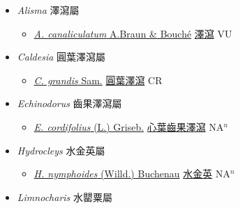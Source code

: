 
  \begin{itemize}
 \item[] \textit{Alisma} 澤瀉屬
                    
  \begin{itemize}
        \item[] \href{http://www.theplantlist.org/tpl1.1/search?q=Alisma+canaliculatum}{\textit{A. canaliculatum} A.Braun \& Bouché}   \href{\detokenize{http://taibnet.sinica.edu.tw/chi/taibnet_species_list.php?T2=澤瀉&T2_new_value=true&fr=y}}{澤瀉} VU
  \end{itemize}
 \item[] \textit{Caldesia} 圓葉澤瀉屬
                    
  \begin{itemize}
        \item[] \href{http://www.theplantlist.org/tpl1.1/search?q=Caldesia+grandis}{\textit{C. grandis} Sam.}   \href{\detokenize{http://taibnet.sinica.edu.tw/chi/taibnet_species_list.php?T2=圓葉澤瀉&T2_new_value=true&fr=y}}{圓葉澤瀉} CR
  \end{itemize}
 \item[] \textit{Echinodorus} 齒果澤瀉屬
                    
  \begin{itemize}
        \item[] \href{http://www.theplantlist.org/tpl1.1/search?q=Echinodorus+cordifolius}{\textit{E. cordifolius} (L.) Griseb.}   \href{\detokenize{http://taibnet.sinica.edu.tw/chi/taibnet_species_list.php?T2=心葉齒果澤瀉&T2_new_value=true&fr=y}}{心葉齒果澤瀉} NA$^n$
  \end{itemize}
 \item[] \textit{Hydrocleys} 水金英屬
                    
  \begin{itemize}
        \item[] \href{http://www.theplantlist.org/tpl1.1/search?q=Hydrocleys+nymphoides}{\textit{H. nymphoides} (Willd.) Buchenau}   \href{\detokenize{http://taibnet.sinica.edu.tw/chi/taibnet_species_list.php?T2=水金英&T2_new_value=true&fr=y}}{水金英} NA$^n$
  \end{itemize}
 \item[] \textit{Limnocharis} 水罌粟屬
                    

\end{itemize}
